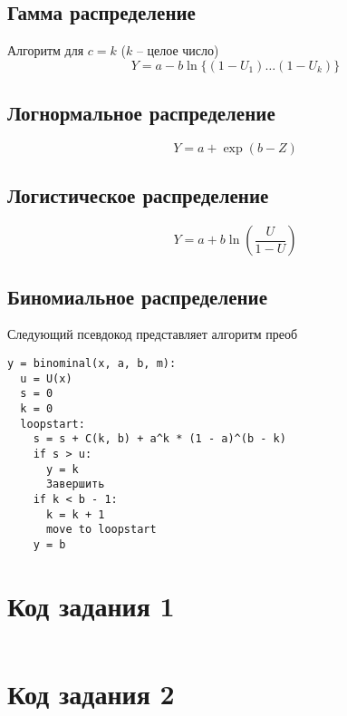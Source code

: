 \documentclass[bachelor, och, labwork]{SCWorks}
\begin{document}
\subsection{Гамма распределение}
Алгоритм для $c = k$ ($k$ -- целое число)
\[ Y = a - b \ln \{(1 - U_1) \dots (1 - U_k)\} \]

\subsection{Логнормальное распределение}
\[ Y = a + \exp(b - Z) \]

\subsection{Логистическое распределение}
\[ Y = a + b \ln(\frac{U}{1 - U})\]

\subsection{Биномиальное распределение}
Следующий псевдокод представляет алгоритм преоб
\begin{verbatim}
y = binominal(x, a, b, m):
  u = U(x)
  s = 0
  k = 0
  loopstart:
    s = s + C(k, b) + a^k * (1 - a)^(b - k)
    if s > u:
      y = k
      Завершить
    if k < b - 1:
      k = k + 1
      move to loopstart
    y = b
\end{verbatim}
\newpage
\appendix
    \section{Код задания 1}
    \inputminted[fontsize=\footnotesize]{text}{main.cpp}

    \section{Код задания 2}
    \inputminted[fontsize=\footnotesize]{text}{main2.cpp}




\end{document}
